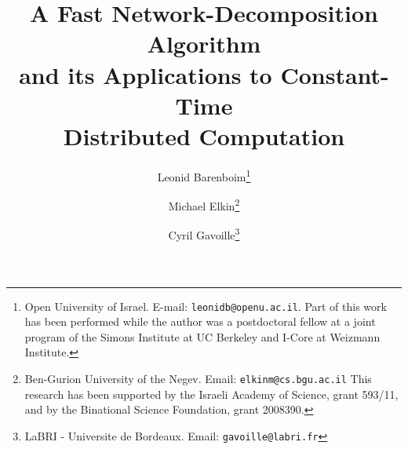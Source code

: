 \documentclass[11pt]{article}
\begin{document}
\newtheorem{thm}{Theorem}[section]
\theoremstyle{definition}
\newtheorem{dfn}{Definition}[section]
\theoremstyle{remark}
\theoremstyle{plain}
\newtheorem{lem}[thm]{Lemma}
\newtheorem{col}[thm]{Corollary}
\newtheorem{fact}[thm]{Fact}
\newtheorem{fig}[figure]{Fig.}

\def\MathN{\hbox{\rm I\kern-2pt I\kern-3.1pt N}}
\def\Expect{\hbox{\rm I\kern-2pt I\kern-3.1pt E}}
\title{A Fast Network-Decomposition Algorithm \\ and its Applications to Constant-Time \\ Distributed Computation}
\author{Leonid Barenboim\thanks{Open University of Israel.
 E-mail: {\tt leonidb@openu.ac.il}. 
 Part of this work has been performed while the author was a postdoctoral fellow at a joint program of the Simons Institute at UC Berkeley and I-Core at Weizmann Institute.} 
 \and Michael Elkin\thanks{Ben-Gurion University of the Negev. Email: {\tt elkinm@cs.bgu.ac.il} 
This research has been supported by the Israeli Academy of Science, grant 593/11, and by the Binational Science Foundation, grant 2008390.} \and Cyril Gavoille\thanks{LaBRI - Universite de Bordeaux. Email: {\tt gavoille@labri.fr}}}
\end{document}

